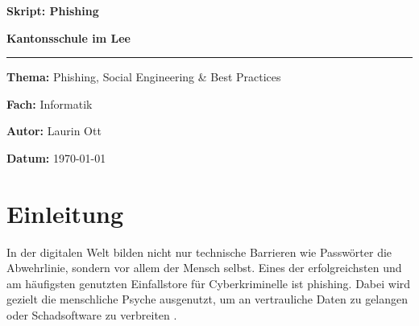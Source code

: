 \documentclass[12pt,a4paper]{article}
\begin{document}
\begin{titlepage}
    \centering
    \vspace*{2cm}
    
    {\Huge \textbf{Skript: Phishing} \par}
    \vspace{1.5cm}
    {\Large \textbf{Kantonsschule im Lee} \par}
    \vspace{2cm}
    
    \rule{\linewidth}{0.5mm}
    \vspace{2cm}
    
    {\large \textbf{Thema:} Phishing, Social Engineering \& Best Practices \par}
    \vspace{0.5cm}
    {\large \textbf{Fach:} Informatik \par}
    \vspace{0.5cm}
    {\large \textbf{Autor:} Laurin Ott \par}
    
    \vfill
    
    {\large \textbf{Datum:} \today \par}
\end{titlepage}

\newpage
\tableofcontents
\newpage

\section{Einleitung}
In der digitalen Welt bilden nicht nur technische Barrieren wie Passwörter die Abwehrlinie, sondern vor allem der Mensch selbst. Eines der erfolgreichsten und am häufigsten genutzten Einfallstore für Cyberkriminelle ist \gls{phishing}. Dabei wird gezielt die menschliche Psyche ausgenutzt, um an vertrauliche Daten zu gelangen oder Schadsoftware zu verbreiten \cite{bsi2023smtpsmuggling}.
\end{document}
